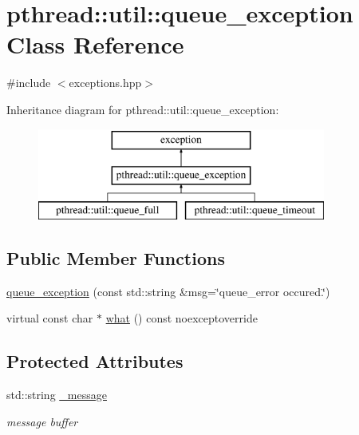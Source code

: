 \hypertarget{classpthread_1_1util_1_1queue__exception}{\section{pthread\+:\+:util\+:\+:queue\+\_\+exception Class Reference}
\label{classpthread_1_1util_1_1queue__exception}
}


{\ttfamily \#include $<$exceptions.\+hpp$>$}

Inheritance diagram for pthread\+:\+:util\+:\+:queue\+\_\+exception\+:\begin{figure}[H]
\begin{center}
\leavevmode
\includegraphics[height=3.000000cm]{classpthread_1_1util_1_1queue__exception}
\end{center}
\end{figure}
\subsection*{Public Member Functions}
\begin{DoxyCompactItemize}
\item 
\hyperlink{classpthread_1_1util_1_1queue__exception_abdae10e09e6f7cb24f64f0aee107590c}{queue\+\_\+exception} (const std\+::string \&msg=\char`\"{}queue\+\_\+error occured.\char`\"{})
\item 
virtual const char $\ast$ \hyperlink{classpthread_1_1util_1_1queue__exception_af5d4a0f938d6fa15bf417874a3e53457}{what} () const noexceptoverride
\end{DoxyCompactItemize}
\subsection*{Protected Attributes}
\begin{DoxyCompactItemize}
\item 
\hypertarget{classpthread_1_1util_1_1queue__exception_a16e98607fa8cdcbd76e16f8965db533e}{std\+::string \hyperlink{classpthread_1_1util_1_1queue__exception_a16e98607fa8cdcbd76e16f8965db533e}{\+\_\+message}}\label{classpthread_1_1util_1_1queue__exception_a16e98607fa8cdcbd76e16f8965db533e}

\begin{DoxyCompactList}\small\item\em message buffer \end{DoxyCompactList}\end{DoxyCompactItemize}


